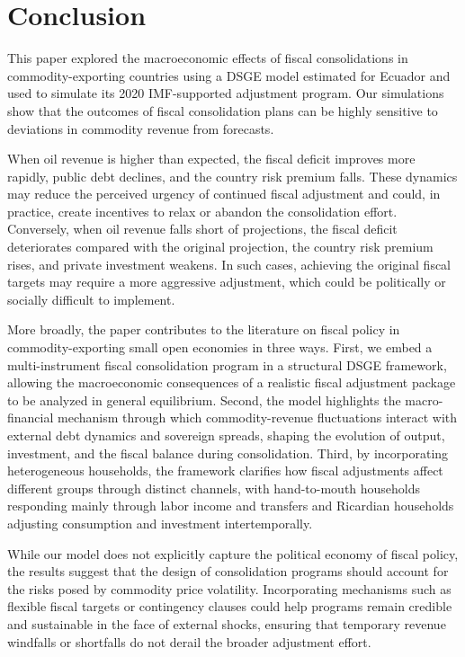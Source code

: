 \documentclass[12pt]{article}
\begin{document}
\section{Conclusion}\label{sec:conclusion}

This paper explored the macroeconomic effects of fiscal consolidations in commodity-exporting countries using a DSGE model estimated for Ecuador and used to simulate its 2020 IMF-supported adjustment program. Our simulations show that the outcomes of fiscal consolidation plans can be highly sensitive to deviations in commodity revenue from forecasts.

When oil revenue is higher than expected, the fiscal deficit improves more rapidly, public debt declines, and the country risk premium falls. These dynamics may reduce the perceived urgency of continued fiscal adjustment and could, in practice, create incentives to relax or abandon the consolidation effort. Conversely, when oil revenue falls short of projections, the fiscal deficit deteriorates compared with the original projection, the country risk premium rises, and private investment weakens. In such cases, achieving the original fiscal targets may require a more aggressive adjustment, which could be politically or socially difficult to implement.

More broadly, the paper contributes to the literature on fiscal policy in commodity-exporting small open economies in three ways. First, we embed a multi-instrument fiscal consolidation program in a structural DSGE framework, allowing the macroeconomic consequences of a realistic fiscal adjustment package to be analyzed in general equilibrium. Second, the model highlights the macro-financial mechanism through which commodity-revenue fluctuations interact with external debt dynamics and sovereign spreads, shaping the evolution of output, investment, and the fiscal balance during consolidation. Third, by incorporating heterogeneous households, the framework clarifies how fiscal adjustments affect different groups through distinct channels, with hand-to-mouth households responding mainly through labor income and transfers and Ricardian households adjusting consumption and investment intertemporally.

While our model does not explicitly capture the political economy of fiscal policy, the results suggest that the design of consolidation programs should account for the risks posed by commodity price volatility. Incorporating mechanisms such as flexible fiscal targets or contingency clauses could help programs remain credible and sustainable in the face of external shocks, ensuring that temporary revenue windfalls or shortfalls do not derail the broader adjustment effort.
\end{document}
